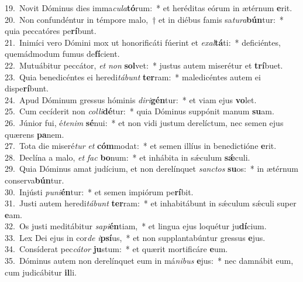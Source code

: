 {19.~}Novit Dóminus dies imma\textit{cu}\textit{la}\textbf{tó}rum:~* et heréditas eórum in ætérnum \textbf{e}rit.\\
{20.~}Non confundéntur in témpore malo,~† et in diébus famis sa\textit{tu}\textit{ra}\textbf{bún}tur:~* quia peccatóres pe\textbf{rí}bunt.\\
{21.~}Inimíci vero Dómini mox ut honorificáti fúerint et \textit{e}\textit{xal}\textbf{tá}ti:~* deficiéntes, quemádmodum fumus de\textbf{fí}cient.\\
{22.~}Mutuábitur peccátor, \textit{et} \textit{non} \textbf{sol}vet:~* justus autem miserétur et \textbf{trí}buet.\\
{23.~}Quia benedicéntes ei heredi\textit{tá}\textit{bunt} \textbf{ter}ram:~* maledicéntes autem ei dispe\textbf{rí}bunt.\\
{24.~}Apud Dóminum gressus hóminis \textit{di}\textit{ri}\textbf{gén}tur:~* et viam ejus \textbf{vo}let.\\
{25.~}Cum cecíderit non \textit{col}\textit{li}\textbf{dé}tur:~* quia Dóminus suppónit manum \textbf{su}am.\\
{26.~}Júnior fui, é\textit{te}\textit{nim} \textbf{sé}nui:~* et non vidi justum derelíctum, nec semen ejus quærens \textbf{pa}nem.\\
{27.~}Tota die miseré\textit{tur} \textit{et} \textbf{cóm}modat:~* et semen illíus in benedictióne \textbf{e}rit.\\
{28.~}Declína a malo, \textit{et} \textit{fac} \textbf{bo}num:~* et inhábita in sǽculum \textbf{sǽ}culi.\\
{29.~}Quia Dóminus amat judícium, et non derelínquet \textit{san}\textit{ctos} \textbf{su}os:~* in ætérnum conserva\textbf{bún}tur.\\
{30.~}Injústi \textit{pu}\textit{ni}\textbf{én}tur:~* et semen impiórum pe\textbf{rí}bit.\\
{31.~}Justi autem heredi\textit{tá}\textit{bunt} \textbf{ter}ram:~* et inhabitábunt in sǽculum sǽculi super \textbf{e}am.\\
{32.~}Os justi meditábitur \textit{sa}\textit{pi}\textbf{én}tiam,~* et lingua ejus loquétur ju\textbf{dí}cium.\\
{33.~}Lex Dei ejus in cor\textit{de} \textit{i}\textbf{psí}us,~* et non supplantabúntur gressus \textbf{e}jus.\\
{34.~}Consíderat pec\textit{cá}\textit{tor} \textbf{ju}stum:~* et quærit mortificáre \textbf{e}um.\\
{35.~}Dóminus autem non derelínquet eum in má\textit{ni}\textit{bus} \textbf{e}jus:~* nec damnábit eum, cum judicábitur \textbf{il}li.\\
